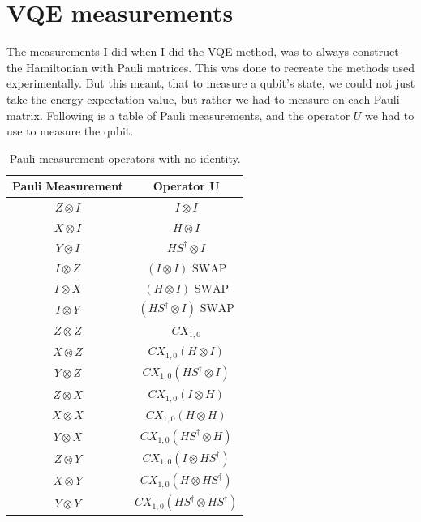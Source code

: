 \documentclass[11pt, letterpaper, titlepage]{article}
\begin{document}
\section{VQE measurements}
The measurements I did when I did the VQE method, was to always construct the Hamiltonian with Pauli matrices. This was done to recreate the methods used experimentally. But this meant, that to measure a qubit's state, we could not just take the energy expectation value, but rather we had to measure on each Pauli matrix. Following is a table of Pauli measurements, and the operator \(U\) we had to use to measure the qubit. 
\begin{table}[h]
        \centering
        \begin{tabular}{c|c}
            \textbf{Pauli Measurement} & \textbf{Operator U} \\ \hline
            $Z \otimes I$ & $I \otimes I$ \\
            $X \otimes I$ & $H \otimes I$ \\
            $Y \otimes I$ & $H S^\dagger \otimes I$ \\
            $I \otimes Z$ & $(I \otimes I) \text{ SWAP}$ \\
            $I \otimes X$ & $(H \otimes I) \text{ SWAP}$ \\
            $I \otimes Y$ & $(H S^\dagger \otimes I) \text{ SWAP}$ \\
            $Z \otimes Z$ & $CX_{1,0}$ \\
            $X \otimes Z$ & $CX_{1,0} (H \otimes I)$ \\
            $Y \otimes Z$ & $CX_{1,0} (H S^\dagger \otimes I)$ \\
            $Z \otimes X$ & $CX_{1,0} (I \otimes H)$ \\
            $X \otimes X$ & $CX_{1,0} (H \otimes H)$ \\
            $Y \otimes X$ & $CX_{1,0} (H S^\dagger \otimes H)$ \\
            $Z \otimes Y$ & $CX_{1,0} (I \otimes H S^\dagger)$ \\
            $X \otimes Y$ & $CX_{1,0} (H \otimes H S^\dagger)$ \\
            $Y \otimes Y$ & $CX_{1,0} (H S^\dagger \otimes H S^\dagger)$ \\
        \end{tabular}
        \caption{Pauli measurement operators with no identity.}
    \end{table}
    
\end{document}
